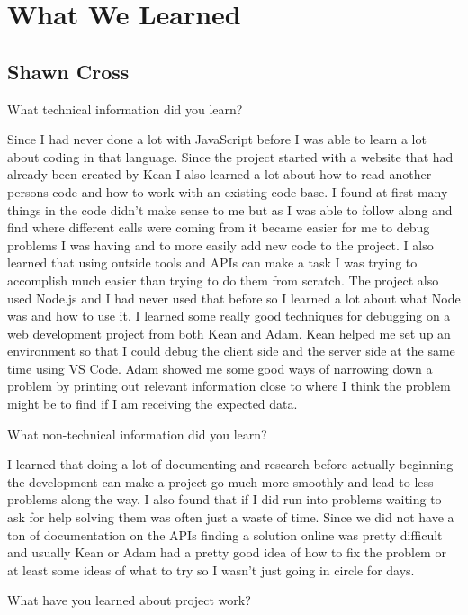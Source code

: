 \documentclass[letterpaper, 10pt, draftclsnofoot, compsoc, onecolumn]{IEEEtran}
\begin{document}
\section{What We Learned}
\subsection{Shawn Cross}
What technical information did you learn?

Since I had never done a lot with JavaScript before I was able to learn a lot about coding in that language. Since the project started with a website that had already been created by Kean I also learned a lot about how to read another persons code and how to work with an existing code base. I found at first many things in the code didn't make sense to me but as I was able to follow along and find where different calls were coming from it became easier for me to debug problems I was having and to more easily add new code to the project. I also learned that using outside tools and APIs can make a task I was trying to accomplish much easier than trying to do them from scratch. The project also used Node.js and I had never used that before so I learned a lot about what Node was and how to use it. I learned some really good techniques for debugging on a web development project from both Kean and Adam. Kean helped me set up an environment so that I could debug the client side and the server side at the same time using VS Code. Adam showed me some good ways of narrowing down a problem by printing out relevant information close to where I think the problem might be to find if I am receiving the expected data. 

What non-technical information did you learn?

I learned that doing a lot of documenting and research before actually beginning the development can make a project go much more smoothly and lead to less problems along the way. I also found that if I did run into problems waiting to ask for help solving them was often just a waste of time. Since we did not have a ton of documentation on the APIs finding a solution online was pretty difficult and usually Kean or Adam had a pretty good idea of how to fix the problem or at least some ideas of what to try so I wasn't just going in circle for days. 

What have you learned about project work?
\end{document}
